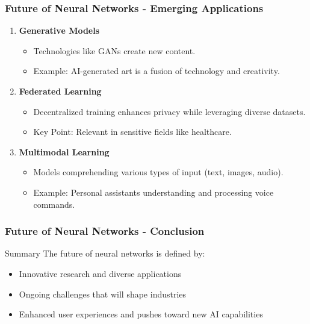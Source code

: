 \documentclass[aspectratio=169]{beamer}
\begin{document}
\begin{frame}[fragile]
    \frametitle{Future of Neural Networks - Emerging Applications}
    \begin{enumerate}
        \item \textbf{Generative Models}
            \begin{itemize}
                \item Technologies like GANs create new content.
                \item Example: AI-generated art is a fusion of technology and creativity.
            \end{itemize}
        
        \item \textbf{Federated Learning}
            \begin{itemize}
                \item Decentralized training enhances privacy while leveraging diverse datasets.
                \item Key Point: Relevant in sensitive fields like healthcare.
            \end{itemize}
        
        \item \textbf{Multimodal Learning}
            \begin{itemize}
                \item Models comprehending various types of input (text, images, audio).
                \item Example: Personal assistants understanding and processing voice commands.
            \end{itemize}
    \end{enumerate}
\end{frame}

\begin{frame}[fragile]
    \frametitle{Future of Neural Networks - Conclusion}
    \begin{block}{Summary}
        The future of neural networks is defined by:
        \begin{itemize}
            \item Innovative research and diverse applications
            \item Ongoing challenges that will shape industries
            \item Enhanced user experiences and pushes toward new AI capabilities
        \end{itemize}
    \end{block}
\end{frame}
\end{document}
